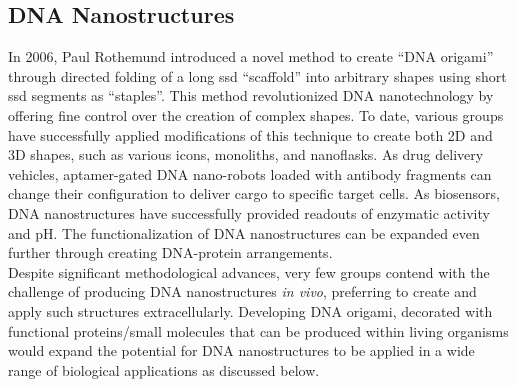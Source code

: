 \documentclass[a4paper]{article}
\begin{document}
\subsection*{DNA Nanostructures}
In 2006, Paul Rothemund introduced a novel method to create “DNA origami” through directed folding of a long \ac{ssd} “scaffold” into arbitrary shapes using short \ac{ssd} segments as “staples”\cite{intro1}.
This method revolutionized DNA nanotechnology by offering fine control over the creation of complex shapes.
To date, various  groups have successfully applied modifications of this technique to create both 2D and 3D shapes, such as various icons, monoliths, and nanoflasks\cite{intro1,intro2,intro3,intro4}.
As drug delivery vehicles, aptamer-gated DNA nano-robots loaded with antibody fragments can change their configuration to deliver cargo to specific target cells\cite{intro5}.
As biosensors, DNA nanostructures have successfully provided readouts of enzymatic activity and pH\cite{intro6,intro7}.
The functionalization of DNA nanostructures can be expanded even further through creating DNA-protein arrangements.
\vspace{2 mm}
\\
Despite significant methodological advances, very few groups contend with the challenge of producing DNA nanostructures \textit{in vivo}, preferring to create and apply such structures extracellularly.
Developing DNA origami, decorated with functional proteins/small molecules that can be produced within living organisms would expand the potential for DNA nanostructures to be applied in a wide range of biological applications as discussed below.
\end{document}
